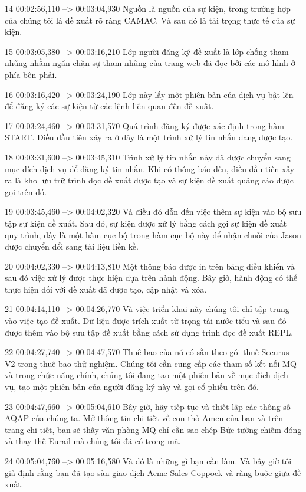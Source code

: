 14
00:02:56,110 --> 00:03:04,930
Nguồn là nguồn của sự kiện, trong trường hợp của chúng tôi là đề xuất rõ ràng CAMAC.  Và sau đó là tải trọng thực tế của sự kiện.

15
00:03:05,380 --> 00:03:16,210
Lớp người đăng ký đề xuất là lớp chống tham nhũng nhằm ngăn chặn sự tham nhũng của trang web đã đọc bởi các mô hình ở phía bên phải.

16
00:03:16,420 --> 00:03:24,190
Lớp này lấy một phiên bản của dịch vụ bật lên để đăng ký các sự kiện từ các lệnh liên quan đến đề xuất.

17
00:03:24,460 --> 00:03:31,570
Quá trình đăng ký được xác định trong hàm START.  Điều đầu tiên xảy ra ở đây là một trình xử lý tin nhắn đang được tạo.

18
00:03:31,600 --> 00:03:45,310
Trình xử lý tin nhắn này đã được chuyển sang mục đích dịch vụ để đăng ký tin nhắn.  Khi có thông báo đến, điều đầu tiên xảy ra là kho lưu trữ trình đọc đề xuất được tạo và sự kiện đề xuất quảng cáo được gọi trên đó.

19
00:03:45,460 --> 00:04:02,320
Và điều đó dẫn đến việc thêm sự kiện vào bộ sưu tập sự kiện đề xuất.  Sau đó, sự kiện được xử lý bằng cách gọi sự kiện đề xuất quy trình, đây là một hàm cục bộ trong hàm cục bộ này để nhận chuỗi của Jason được chuyển đổi sang tài liệu liền kề.

20
00:04:02,330 --> 00:04:13,810
Một thông báo được in trên bảng điều khiển và sau đó việc xử lý được thực hiện dựa trên hành động.  Bây giờ, hành động có thể thực hiện đối với đề xuất đã được tạo, cập nhật và xóa.

21
00:04:14,110 --> 00:04:26,770
Và việc triển khai này chúng tôi chỉ tập trung vào việc tạo đề xuất.  Dữ liệu được trích xuất từ ​​trọng tải nước tiểu và sau đó được thêm vào bộ sưu tập đề xuất bằng cách sử dụng trình đọc đề xuất REPL.

22
00:04:27,740 --> 00:04:47,570
Thuê bao của nó có sẵn theo gói thuế Securus V2 trong thuê bao thử nghiệm.  Chúng tôi cần cung cấp các tham số kết nối MQ và trong chức năng chính, chúng tôi đang tạo một phiên bản về mục đích dịch vụ, tạo một phiên bản của người đăng ký này và gọi cổ phiếu trên đó.

23
00:04:47,660 --> 00:05:04,610
Bây giờ, hãy tiếp tục và thiết lập các thông số AQAP của chúng ta.  Mở thông tin chi tiết về con thỏ Amcu của bạn và trên trang chi tiết, bạn sẽ thấy văn phòng MQ chỉ cần sao chép Bức tường chiếm đóng và thay thế Eurail mà chúng tôi đã có trong mã.

24
00:05:04,760 --> 00:05:16,580
Và đó là những gì bạn cần làm.  Và bây giờ tôi giả định rằng bạn đã tạo sàn giao dịch Acme Sales Coppock và ràng buộc giữa đề xuất.

